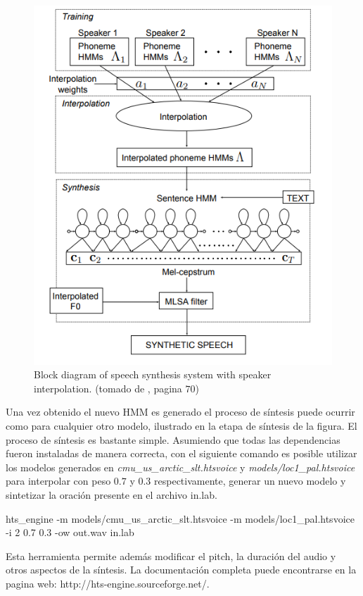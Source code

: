 \begin{figure}
\begin{center}
\includegraphics[scale=0.4]{imagenes/speakerInterpolation.png}
\caption{Block diagram of speech synthesis system with speaker interpolation. (tomado de \cite{phoneticAndProsodic}, pagina $70$) }
\label{spekerInterpolationImagen}
\end{center}
\end{figure}

Una vez obtenido el nuevo HMM es generado el proceso de síntesis puede ocurrir como para cualquier otro modelo, ilustrado en la etapa de síntesis de la figura. El proceso de síntesis es bastante simple. Asumiendo que todas las dependencias fueron instaladas de manera correcta, con el siguiente comando es posible utilizar los modelos generados en \textit{cmu\_us\_arctic\_slt.htsvoice} y \textit{models/loc1\_pal.htsvoice} para interpolar con peso $0.7$ y $0.3$ respectivamente, generar un nuevo modelo y sintetizar la oración presente en el archivo in.lab.

\begin{tcolorbox}
hts\_engine -m models/cmu\_us\_arctic\_slt.htsvoice -m models/loc1\_pal.htsvoice -i 2 0.7 0.3 -ow out.wav in.lab
\end{tcolorbox}

Esta herramienta permite además modificar el pitch, la duración del audio y otros aspectos de la síntesis. La documentación completa puede encontrarse en la pagina web: http://hts-engine.sourceforge.net/.